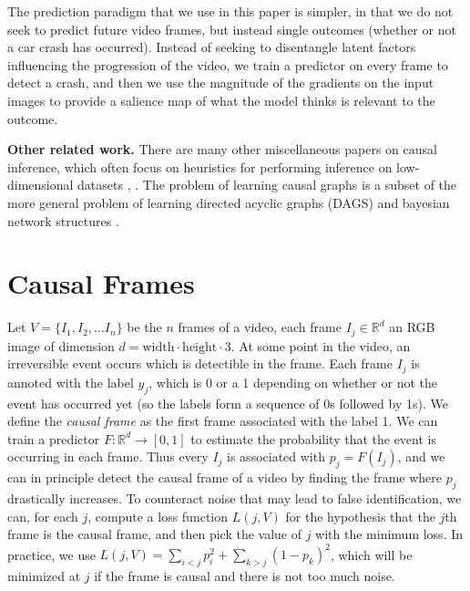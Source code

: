 \documentclass[letterpaper]{article} %
\begin{document}
The prediction paradigm that we use in this paper is simpler, in that we do not seek to predict future video frames, but instead single outcomes (whether or not a car crash has occurred). Instead of seeking to disentangle latent factors influencing the progression of the video, we train a predictor on every frame to detect a crash, and then we use the magnitude of the gradients on the input images to provide a salience map of what the model thinks is relevant to the outcome. %

\noindent \textbf{Other related work.} There are many other miscellaneous papers on causal inference, which often focus on heuristics for performing inference on low-dimensional datasets \cite{veitch2019using}, \cite{rojas2018invariant}. The problem of learning causal graphs is a subset of the more general problem of learning directed acyclic graphs (DAGS) \cite{xie2008recursive} and bayesian network structures \cite{daly2011learning}. %




\section{Causal Frames}

Let $V = \{I_1, I_2, ... I_n\}$ be the $n$ frames of a video, each frame $I_j  \in \mathbb{R}^d$ an RGB image of dimension $d=\text{width}\cdot\text{height}\cdot 3$. At some point in the video, an irreversible event occurs which is detectible in the frame. Each frame $I_j$ is annoted with the label $y_j$, which is 0 or a 1 depending on whether or not the event has occurred yet (so the labels form a sequence of 0s followed by 1s). We define the \emph{causal frame} as the first frame associated with the label 1. We can train a predictor $F: \mathbb{R}^d \rightarrow [0,1]$ to estimate the probability that the event is occurring in each frame. Thus every $I_j$ is associated with $p_j = F(I_j)$, and we can in principle detect the causal frame of a video by finding the frame where $p_j$ drastically increases. To counteract noise that may lead to false identification, we can, for each $j$, compute a loss function $L(j, V)$ for the hypothesis that the $j$th frame is the causal frame, and then pick the value of $j$ with the minimum loss. In practice, we use  $L(j, V) = \sum_{i<j} p_i^2 + \sum_{k>j} (1-p_k)^2$, which will be minimized at $j$ if the frame is causal and there is not too much noise. %
\end{document}
